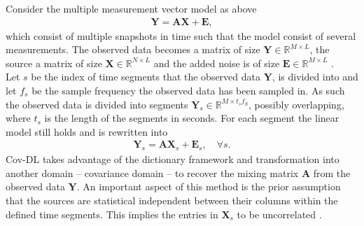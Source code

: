 Consider the multiple measurement vector model as above
\begin{align*}
\mathbf{Y} = \mathbf{AX}+\textbf{E},
\end{align*}
which consist of multiple snapshots in time such that the model consist of several measurements. The observed data becomes a matrix of size $\mathbf{Y} \in \mathbb{R}^{M \times L}$, the source a matrix of size $\mathbf{X} \in \mathbb{R}^{N \times L}$ and the added noise is of size $\mathbf{E} \in \mathbb{R}^{M \times L}$ .
\\
Let $s$ be the index of time segments that the observed data $\mathbf{Y}$, is divided into and let $f_s$ be the sample frequency the observed data has been sampled in. As such the observed data is divided into segments $\mathbf{Y}_s \in \mathbb{R}^{M \times t_s f_S}$, possibly overlapping, where $t_s$ is the length of the segments in seconds. For each segment the linear model still holds and is rewritten into
\begin{align*}
\mathbf{Y}_s = \mathbf{AX}_s + \textbf{E}_s, \quad \forall s.
\end{align*}
Cov-DL takes advantage of the dictionary framework and transformation into another domain -- covariance domain -- to recover the mixing matrix $\mathbf{A}$ from the observed data $\mathbf{Y}$. An important aspect of this method is the prior assumption that the sources are statistical independent between their columns within the defined time segments. This implies the entries in $\textbf{X}_s$ to be uncorrelated .\\  
